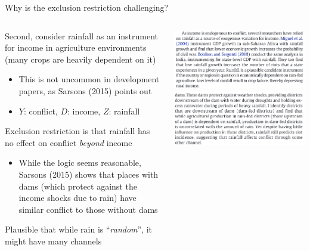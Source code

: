 \documentclass[notes,11pt, aspectratio=169]{beamer}
\newenvironment{wideitemize}{\itemize\addtolength{\itemsep}{10pt}}{\enditemize}
\begin{document}
\begin{frame}{Why is the exclusion restriction challenging?}
  \begin{columns}[T] %
    \begin{column}{0.6\textwidth}
      \begin{wideitemize}
      \item Second, consider rainfall as an instrument for income in
        agriculture environments (many crops are heavily dependent on
        it)
        \begin{itemize}
        \item This is not uncommon in development papers, as Sarsons
          (2015) points out
        \item $Y$: conflict, $D$: income, $Z$: rainfall
        \end{itemize}
      \item Exclusion restriction is that rainfall has no effect on
        conflict \emph{beyond} income
        \begin{itemize}
        \item While the logic seems reasonable, Sarsons (2015) shows
          that places with dams (which protect against the income shocks
          due to rain) have similar conflict to those without dams
        \end{itemize}
      \item Plausible that while rain is ``\emph{random}'', it might
        have many channels
      \end{wideitemize}
\end{column}
\begin{column}{0.4\textwidth}
  \includegraphics[width=\linewidth]{images/sarsonsa.png}\\
      \includegraphics[width=\linewidth]{images/sarsonsb.png}\\
\end{column}
\end{columns}
\end{frame}
\end{document}
